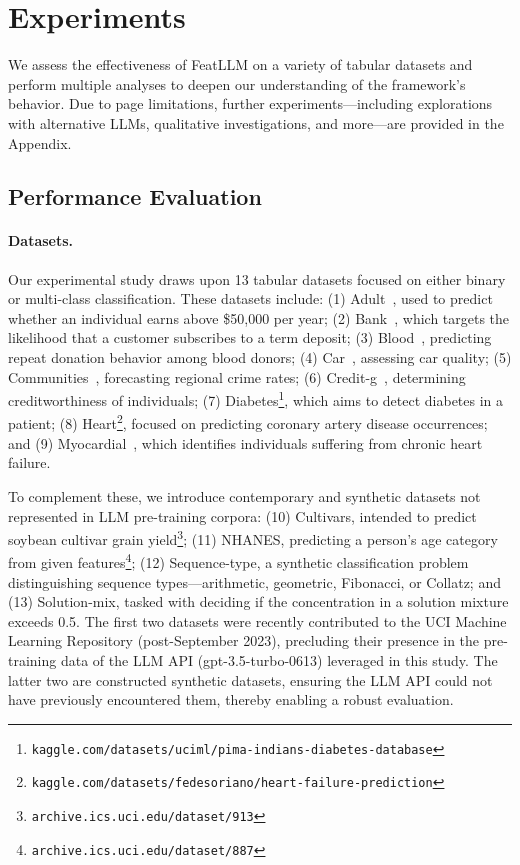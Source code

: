 \section{Experiments}
We assess the effectiveness of \textsf{FeatLLM} on a variety of tabular datasets and perform multiple analyses to deepen our understanding of the framework's behavior. Due to page limitations, further experiments—including explorations with alternative LLMs, qualitative investigations, and more—are provided in the Appendix.

\subsection{Performance Evaluation}
\paragraph{Datasets.}
Our experimental study draws upon 13 tabular datasets focused on either binary or multi-class classification. These datasets include: (1) Adult~\cite{asuncion2007uci}, used to predict whether an individual earns above \$50,000 per year; (2) Bank~\cite{moro2014data}, which targets the likelihood that a customer subscribes to a term deposit; (3) Blood~\cite{yeh2009knowledge}, predicting repeat donation behavior among blood donors; (4) Car~\cite{kadra2021well}, assessing car quality; (5) Communities~\cite{misc_communities_and_crime_183}, forecasting regional crime rates; (6) Credit-g~\cite{kadra2021well}, determining creditworthiness of individuals; (7) Diabetes\footnote{\texttt{kaggle.com/datasets/uciml/pima-indians-diabetes-database}}, which aims to detect diabetes in a patient; (8) Heart\footnote{\texttt{kaggle.com/datasets/fedesoriano/heart-failure-prediction}}, focused on predicting coronary artery disease occurrences; and (9) Myocardial~\cite{misc_myocardial_infarction_complications_579}, which identifies individuals suffering from chronic heart failure.

To complement these, we introduce contemporary and synthetic datasets not represented in LLM pre-training corpora: (10) Cultivars, intended to predict soybean cultivar grain yield\footnote{\texttt{archive.ics.uci.edu/dataset/913}}; (11) NHANES, predicting a person's age category from given features\footnote{\texttt{archive.ics.uci.edu/dataset/887}}; (12) Sequence-type, a synthetic classification problem distinguishing sequence types—arithmetic, geometric, Fibonacci, or Collatz; and (13) Solution-mix, tasked with deciding if the concentration in a solution mixture exceeds 0.5. The first two datasets were recently contributed to the UCI Machine Learning Repository (post-September 2023), precluding their presence in the pre-training data of the LLM API (gpt-3.5-turbo-0613) leveraged in this study. The latter two are constructed synthetic datasets, ensuring the LLM API could not have previously encountered them, thereby enabling a robust evaluation.

